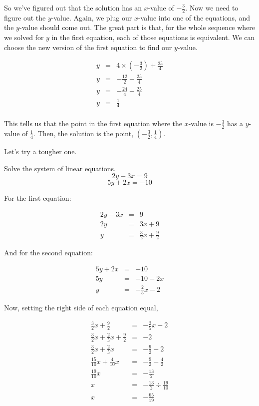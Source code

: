 \begin{example}
So we've figured out that the solution has an $x$-value of $-\frac{3}{2}$.  Now we need to figure out the $y$-value.  Again, we plug our $x$-value into one of the equations, and the $y$-value should come out.  The great part is that, for the whole sequence where we solved for $y$ in the first equation, each of those equations is equivalent.  We can choose the new version of the first equation to find our $y$-value.

$$\begin{array}{rcl}
y & = & 4\times \left(-\frac{3}{2}\right) + \frac{25}{4}\\
y & = & -\frac{12}{2} + \frac{25}{4}\\
y & = & -\frac{24}{4} + \frac{25}{4}\\
y & = & \frac{1}{4}\\
\end{array}$$

This tells us that the point in the first equation where the $x$-value is $-\frac{3}{2}$ has a $y$-value of $\frac{1}{4}$.  Then, the solution is the point, $\left(-\frac{3}{2}, \frac{1}{4}\right)$.
\end{example}

Let's try a tougher one.

\begin{example}
Solve the system of linear equations.
$$2y - 3x = 9$$
$$5y + 2x = -10$$

For the first equation:

$$\begin{array}{rcl}
2y - 3x & = & 9\\
2y & = & 3x + 9\\
y & = & \frac{3}{2}x + \frac{9}{2} \end{array}$$

And for the second equation:

$$\begin{array}{rcl}
5y + 2x & = & -10\\
5y & = & -10 - 2x\\
y & = & -\frac{2}{5}x - 2 \end{array}$$

Now, setting the right side of each equation equal, 

$$\begin{array}{rcl}
\frac{3}{2}x + \frac{9}{2} & = & -\frac{2}{5}x - 2\\
\frac{3}{2}x + \frac{2}{5}x + \frac{9}{2} & = & - 2\\
\frac{3}{2}x + \frac{2}{5}x & = & -\frac{9}{2} - 2\\
\frac{15}{10}x + \frac{4}{10}x & = & -\frac{9}{2} - \frac{4}{2}\\
\frac{19}{10}x & = & -\frac{13}{2}\\
x & = & -\frac{13}{2} \div \frac{19}{10}\\
x & = & -\frac{65}{19} \\

\end{array}$$
\end{example}